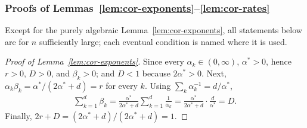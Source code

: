 \subsubsection*{Proofs of Lemmas~\ref{lem:cor-exponents}--\ref{lem:cor-rates}}

Except for the purely algebraic Lemma~\ref{lem:cor-exponents}, all statements below are for $n$ sufficiently large; each eventual condition is named where it is used.

\begin{proof}[Proof of Lemma~\ref{lem:cor-exponents}]
Since every $\alpha_k\in(0,\infty)$, $\alpha^*>0$, hence $r>0$, $D>0$, and $\beta_k>0$; and $D<1$ because $2\alpha^*>0$. Next, $\alpha_k\beta_k=\alpha^*/(2\alpha^*+d)=r$ for every $k$. Using $\sum_k\alpha_k^{-1}=d/\alpha^*$,
\begin{align*}
\sum_{k=1}^d\beta_k=\frac{\alpha^*}{2\alpha^*+d}\sum_{k=1}^d\frac1{\alpha_k}=\frac{\alpha^*}{2\alpha^*+d}\cdot\frac d{\alpha^*}=D.
\end{align*}
Finally, $2r+D=(2\alpha^*+d)/(2\alpha^*+d)=1$.
\end{proof}

